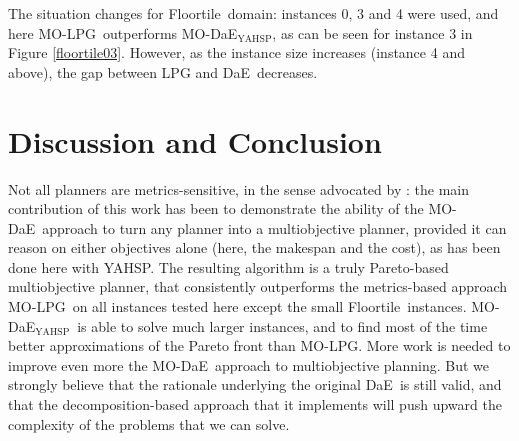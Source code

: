 \documentclass{article}
\def\DAE{{\sc DaE}}
\def\YAHSP{{\sc YAHSP}}
\def\MODAE{{\sc MO-DaE}}
\newcommand{\MODAEYAHSP}{{\sc MO-DaE$_{\text{YAHSP}}$}}
\newcommand{\MOLPG}{{\sc MO-LPG}}
\newcommand{\FLOORTILE}{{\sc Floortile}}
\newcommand{\mycomments}[1]{\textcolor{red}{#1}}
\begin{document}
The situation changes for \FLOORTILE\ domain: instances 0, 3 and 4 were used, and here \MOLPG\ outperforms \MODAEYAHSP, as can be seen for instance 3 in Figure \ref{floortile03}.
However, as the instance size increases (instance 4 and above), the gap between LPG and \DAE\ decreases.


\section{Discussion and Conclusion}
\label{sec:conclusion}

Not all planners are metrics-sensitive, in the sense advocated by \cite{LPG-STAIRS2012}: the main contribution of this work has been to demonstrate the ability of the \MODAE\ approach to turn any planner into a multiobjective planner, provided it can reason on either objectives alone (here, the makespan and the cost), as has been done here with \YAHSP. The resulting algorithm is a truly Pareto-based multiobjective planner, that consistently outperforms the metrics-based approach \MOLPG\ on all instances tested here except the small \FLOORTILE\ instances. \MODAEYAHSP\ is able to solve much larger instances, and to find most of the time better approximations of the Pareto front than \MOLPG. 
More work is needed to improve even more the \MODAE\ approach to multiobjective planning. But we strongly believe that the rationale underlying the original \DAE\ is still valid, and that the decomposition-based approach that it implements will push upward the complexity of the problems that we can solve.
\end{document}
